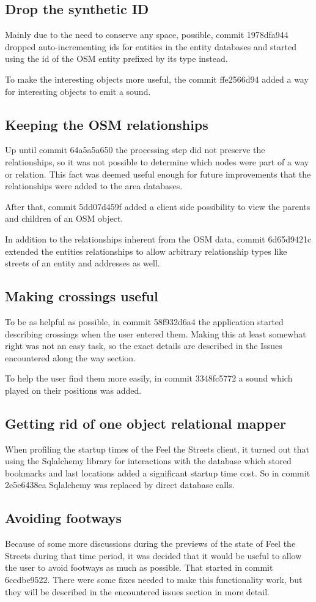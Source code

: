 \documentclass[nolof,digital]{fithesis3}
\begin{document}
\subsection{Drop the synthetic ID}
Mainly due to the need to conserve any space, possible, commit 1978dfa944 dropped auto-incrementing ids for entities in the entity databases and started using the id of the OSM entity prefixed by its type instead.

To make the interesting objects more useful, the commit ffe2566d94 added a way for interesting objects to emit a sound.
\subsection{Keeping the OSM relationships}
Up until commit 64a5a5a650 the processing step did not preserve the relationships, so it was not possible to determine which nodes were part of a way or relation. This fact was deemed useful enough for future improvements that the relationships were added to the area databases.

After that, commit 5dd07d459f added a client side possibility to view the parents and children of an OSM object.

In addition to the relationships inherent from the OSM data, commit 6d65d9421c extended the entities relationships to allow arbitrary relationship types like streets of an entity and addresses as well. 
\subsection{Making crossings useful}
To be as helpful as possible, in commit 58f932d6a4 the application started describing crossings when the user entered them. Making this at least somewhat right was not an easy task, so the exact details are described in the Issues encountered along the way section.

To help the user find them more easily, in commit 3348fc5772 a sound which played on their positions was added.
\subsection{Getting rid of one object relational mapper}
When profiling the startup times of the Feel the Streets client, it turned out that using the Sqlalchemy library for interactions with the database which stored bookmarks and last locations added a significant startup time cost. So in commit 2e5e6438ea Sqlalchemy was replaced by direct database calls.
\subsection{Avoiding footways}
Because of some more discussions during the previews of the state of Feel the Streets during that time period, it was decided that it would be useful to allow the user to avoid footways as much as possible. That started in commit 6ccdbe9522. There were some fixes needed to make this functionality work, but they will be described in the encountered issues section in more detail.
\end{document}
